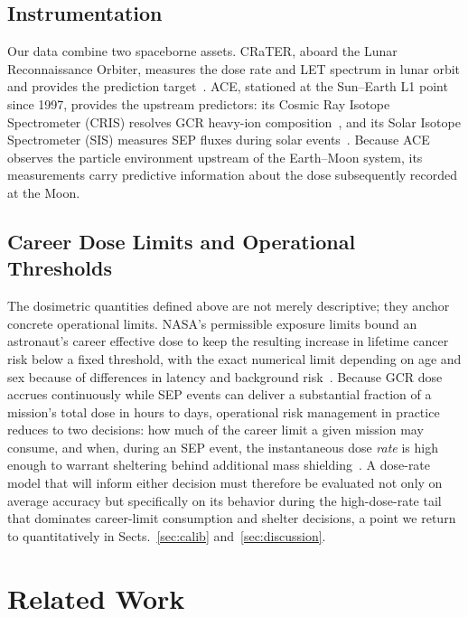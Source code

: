 \documentclass[graybox]{SNmult}
\begin{document}
\subsection{Instrumentation}
Our data combine two spaceborne assets. CRaTER, aboard the Lunar Reconnaissance
Orbiter, measures the dose rate and LET spectrum in lunar orbit and provides the
prediction target~\cite{Spence2010,schwadron2012lunar}. ACE, stationed at the
Sun--Earth L1 point since 1997, provides the upstream predictors: its Cosmic Ray
Isotope Spectrometer (CRIS) resolves GCR heavy-ion
composition~\cite{Cummings1998,Stone1998ACE}, and its Solar Isotope Spectrometer (SIS) measures SEP fluxes
during solar events~\cite{Stone1998SIS}. Because ACE observes the particle
environment upstream of the Earth--Moon system, its measurements carry
predictive information about the dose subsequently recorded at the Moon.

\subsection{Career Dose Limits and Operational Thresholds}
The dosimetric quantities defined above are not merely descriptive; they anchor
concrete operational limits. NASA's permissible exposure limits bound an
astronaut's career effective dose to keep the resulting increase in lifetime
cancer risk below a fixed threshold, with the exact numerical limit depending on
age and sex because of differences in latency and background
risk~\cite{cucinotta2014space}. Because GCR dose accrues continuously while SEP
events can deliver a substantial fraction of a mission's total dose in hours to
days, operational risk management in practice reduces to two decisions: how much
of the career limit a given mission may consume, and when, during an SEP event,
the instantaneous dose \emph{rate} is high enough to warrant sheltering behind
additional mass shielding~\cite{durante2011physical}. A dose-rate model that will
inform either decision must therefore be evaluated not only on average accuracy
but specifically on its behavior during the high-dose-rate tail that dominates
career-limit consumption and shelter decisions, a point we return to
quantitatively in Sects.~\ref{sec:calib} and~\ref{sec:discussion}.

\section{Related Work}
\label{sec:related}
\end{document}
